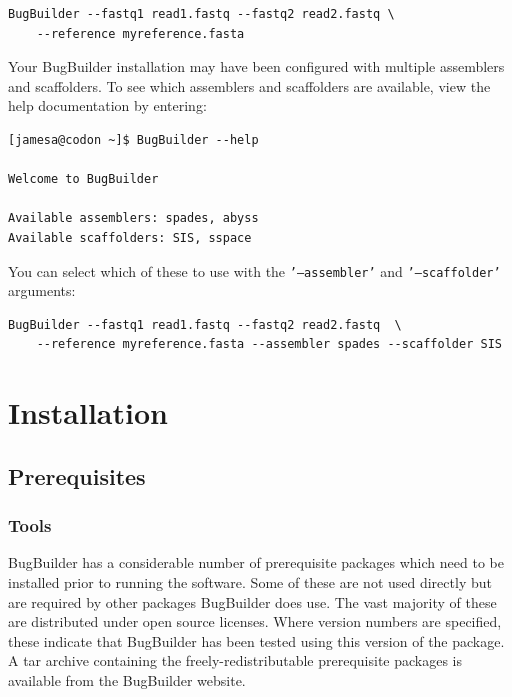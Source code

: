 \documentclass[a4paper,twoside,10pt]{article}
\begin{document}
\begin{verbatim}
BugBuilder --fastq1 read1.fastq --fastq2 read2.fastq \
    --reference myreference.fasta
\end{verbatim}

Your BugBuilder installation may have been configured with multiple assemblers and scaffolders. To
see which assemblers and scaffolders are available, view the help documentation by entering:

\begin{verbatim}
[jamesa@codon ~]$ BugBuilder --help

Welcome to BugBuilder

Available assemblers: spades, abyss
Available scaffolders: SIS, sspace
\end{verbatim}

You can select which of these to use with the {\tt '--assembler'} and {\tt '--scaffolder'}
arguments:

\begin{verbatim}
BugBuilder --fastq1 read1.fastq --fastq2 read2.fastq  \
    --reference myreference.fasta --assembler spades --scaffolder SIS
\end{verbatim}

\section{Installation}

\subsection{Prerequisites}

\subsubsection{Tools}

BugBuilder has a considerable number of prerequisite packages which need to be installed prior to
running the software. Some of these are not used directly but are required by other packages
BugBuilder does use. The vast majority of these are distributed under open source licenses. Where
version numbers are specified, these indicate that BugBuilder has been tested using this version of
the package.  A tar archive containing the freely-redistributable prerequisite packages is available from the
BugBuilder website.
\end{document}

